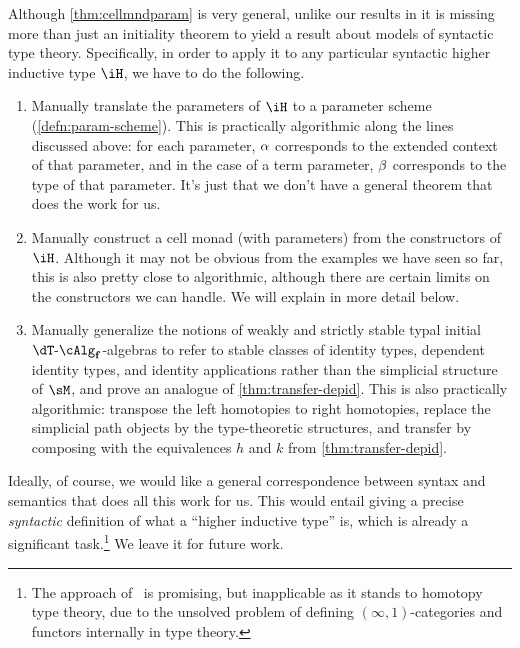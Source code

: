\documentclass{amsart}
\def\alg{\text{-}\cAlg}
\def\algf{\alg_{\mathbf{f}}}
\begin{document}
Although \cref{thm:cellmndparam} is very general, unlike our results in  it is missing more than just an initiality theorem to yield a result about models of syntactic type theory.
Specifically, in order to apply it to any particular syntactic higher inductive type $\iH$, we have to do the following.
\begin{enumerate}
\item Manually translate the parameters of $\iH$ to a parameter scheme (\cref{defn:param-scheme}).
  This is practically algorithmic along the lines discussed above: for each parameter, $\alpha$ corresponds to the extended context of that parameter, and in the case of a term parameter, $\beta$ corresponds to the type of that parameter.
  It's just that we don't have a general theorem that does the work for us.
\item Manually construct a cell monad \dT (with parameters) from the constructors of $\iH$.
  Although it may not be obvious from the examples we have seen so far, this is also pretty close to algorithmic, although there are certain limits on the constructors we can handle.
  We will explain in more detail below.\label{item:hit-mnd}
\item Manually generalize the notions of weakly and strictly stable typal initial $\dT\algf$-algebras to refer to stable classes of identity types, dependent identity types, and identity applications rather than the simplicial structure of $\sM$, and prove an analogue of \cref{thm:transfer-depid}.
  This is also practically algorithmic: transpose the left homotopies to right homotopies, replace the simplicial path objects by the type-theoretic structures, and transfer by composing with the equivalences $h$ and $k$ from \cref{thm:transfer-depid}.
\end{enumerate}
Ideally, of course, we would like a general correspondence between syntax and semantics that does all this work for us.
This would entail giving a precise \emph{syntactic} definition of what a ``higher inductive type'' is, which is already a significant task.\footnote{The approach of~\cite{acdf:qiits} is promising, but inapplicable as it stands to homotopy type theory, due to the unsolved problem of defining $(\infty,1)$-categories and functors internally in type theory.}
We leave it for future work.
\end{document}
